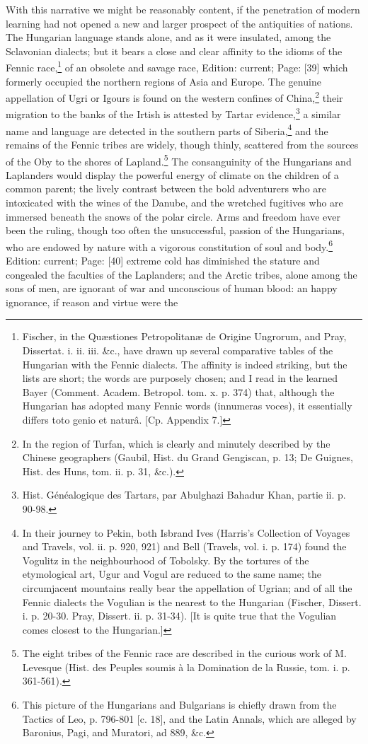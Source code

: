 With this narrative we might be reasonably content, if the penetration of modern learning had not opened a new and larger prospect of the antiquities of nations. The Hungarian language stands alone, and as it were insulated, among the Sclavonian dialects; but it bears a close and clear affinity to the idioms of the Fennic race,\footnote{Fischer, in the Quæstiones Petropolitanæ de Origine Ungrorum, and Pray, Dissertat. i. ii. iii. \&c., have drawn up several comparative tables of the Hungarian with the Fennic dialects. The affinity is indeed striking, but the lists are short; the words are purposely chosen; and I read in the learned Bayer (Comment. Academ. Betropol. tom. x. p. 374) that, although the Hungarian has adopted many Fennic words (innumeras voces), it essentially differs toto genio et naturâ. [Cp. Appendix 7.]} of an obsolete and savage race, Edition: current; Page: [39] which formerly occupied the northern regions of Asia and Europe. The genuine appellation of Ugri or Igours is found on the western confines of China,\footnote{In the region of Turfan, which is clearly and minutely described by the Chinese geographers (Gaubil, Hist. du Grand Gengiscan, p. 13; De Guignes, Hist. des Huns, tom. ii. p. 31, \&c.).} their migration to the banks of the Irtish is attested by Tartar evidence,\footnote{Hist. Généalogique des Tartars, par Abulghazi Bahadur Khan, partie ii. p. 90-98.} a similar name and language are detected in the southern parts of Siberia,\footnote{In their journey to Pekin, both Isbrand Ives (Harris\texthebrew{}’s Collection of Voyages and Travels, vol. ii. p. 920, 921) and Bell (Travels, vol. i. p. 174) found the Vogulitz in the neighbourhood of Tobolsky. By the tortures of the etymological art, Ugur and Vogul are reduced to the same name; the circumjacent mountains really bear the appellation of Ugrian; and of all the Fennic dialects the Vogulian is the nearest to the Hungarian (Fischer, Dissert. i. p. 20-30. Pray, Dissert. ii. p. 31-34). [It is quite true that the Vogulian comes closest to the Hungarian.]} and the remains of the Fennic tribes are widely, though thinly, scattered from the sources of the Oby to the shores of Lapland.\footnote{The eight tribes of the Fennic race are described in the curious work of M. Levesque (Hist. des Peuples soumis à la Domination de la Russie, tom. i. p. 361-561).} The consanguinity of the Hungarians and Laplanders would display the powerful energy of climate on the children of a common parent; the lively contrast between the bold adventurers who are intoxicated with the wines of the Danube, and the wretched fugitives who are immersed beneath the snows of the polar circle. Arms and freedom have ever been the ruling, though too often the unsuccessful, passion of the Hungarians, who are endowed by nature with a vigorous constitution of soul and body.\footnote{This picture of the Hungarians and Bulgarians is chiefly drawn from the Tactics of Leo, p. 796-801 [c. 18], and the Latin Annals, which are alleged by Baronius, Pagi, and Muratori, ad 889, \&c.} Edition: current; Page: [40] extreme cold has diminished the stature and congealed the faculties of the Laplanders; and the Arctic tribes, alone among the sons of men, are ignorant of war and unconscious of human blood: an happy ignorance, if reason and virtue were the 